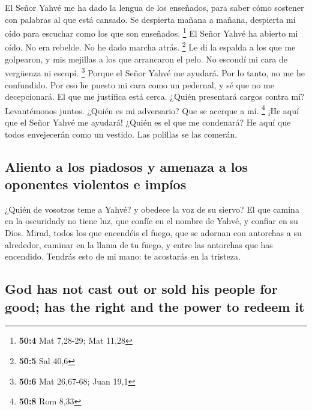 \begin{paracol}{2}
 El Señor Yahvé me ha dado la lengua de los enseñados,
para saber cómo sostener con palabras al que está cansado. Se despierta
mañana a mañana, despierta mi oído para escuchar como los que son
enseñados. \footnote{\textbf{50:4} Mat 7,28-29; Mat 11,28}
 El Señor Yahvé ha abierto mi oído. No era rebelde. No he
dado marcha atrás. \footnote{\textbf{50:5} Sal 40,6}  Le
di la espalda a los que me golpearon, y mis mejillas a los que
arrancaron el pelo. No escondí mi cara de vergüenza ni escupí.
\footnote{\textbf{50:6} Mat 26,67-68; Juan 19,1}  Porque
el Señor Yahvé me ayudará. Por lo tanto, no me he confundido. Por eso he
puesto mi cara como un pedernal, y sé que no me decepcionará.
 El que me justifica está cerca. ¿Quién presentará cargos
contra mí? Levantémonos juntos. ¿Quién es mi adversario? Que se acerque
a mí. \footnote{\textbf{50:8} Rom 8,33}  ¡He aquí que el
Señor Yahvé me ayudará! ¿Quién es el que me condenará? He aquí que todos
envejecerán como un vestido. Las polillas se las comerán.

\hypertarget{aliento-a-los-piadosos-y-amenaza-a-los-oponentes-violentos-e-impuxedos}{%
\subsection{Aliento a los piadosos y amenaza a los oponentes violentos e
impíos}\label{aliento-a-los-piadosos-y-amenaza-a-los-oponentes-violentos-e-impuxedos}}

 ¿Quién de vosotros teme a Yahvé? y obedece la voz de su
siervo? El que camina en la oscuridady no tiene luz, que confíe en el
nombre de Yahvé, y confiar en su Dios.  Mirad, todos los
que encendéis el fuego, que se adornan con antorchas a su alrededor,
caminar en la llama de tu fuego, y entre las antorchas que has
encendido. Tendrás esto de mi mano: te acostarás en la tristeza.

\switchcolumn
\begin{otherlanguage}{english}

\hypertarget{god-has-not-cast-out-or-sold-his-people-for-good-has-the-right-and-the-power-to-redeem-it}{%
\subsection{God has not cast out or sold his people for good; has the
right and the power to redeem
it}\label{god-has-not-cast-out-or-sold-his-people-for-good-has-the-right-and-the-power-to-redeem-it}}


\end{otherlanguage}
\end{paracol}
